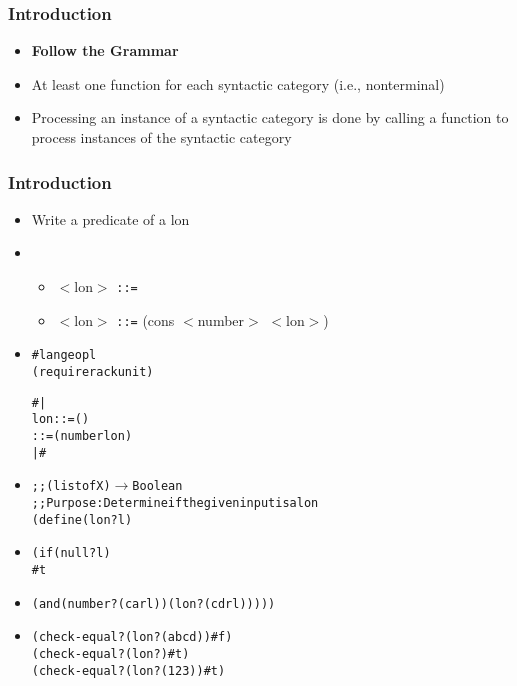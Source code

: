 \documentclass{beamer}
\newcommand{\arrow}{\(\rightarrow\)}
\newcommand{\elist}{\texttt{\textquotesingle{()}}}
\newcommand{\quot}{\texttt{\textquotesingle{}}}
\newcommand{\is}{\texttt{::=}}
\begin{document}
\begin{frame}[fragile]
\frametitle{Introduction}
\begin{scriptsize}
\begin{itemize}
\item<1-> \textbf{Follow the Grammar}

\item<1-> At least one function for each syntactic category (i.e., nonterminal)

\item<1-> Processing an instance of a syntactic category is done by calling a function to process instances of the syntactic category

\end{itemize}
\end{scriptsize}
\end{frame}

\begin{frame}[fragile]
\frametitle{Introduction}
\begin{scriptsize}
\begin{itemize}
\item<1-> Write a predicate of a lon

\item<1->
\begin{itemize}
    \item $<$lon$>$ \is{} \elist{} \newline
    \item $<$lon$>$ \is{} (cons $<$number$>$ $<$lon$>$)
\end{itemize}

\item<2->
\begin{alltt}
#lang eopl
(require rackunit)

#|
lon ::= ()
    ::= (number lon)
|#
\end{alltt}

\item<3->
\begin{alltt}
;; (listof X) \arrow Boolean
;; Purpose: Determine if the given input is a lon
(define (lon? l)
\end{alltt}

\item<5->
\begin{alltt}
  (if (null? l)
      #t
\end{alltt}

\item<6->
\begin{alltt}
      (and (number? (car l)) (lon? (cdr l)))))
\end{alltt}

\item<4->
\begin{alltt}
(check-equal? (lon? \quot{}(a b c d)) #f)
(check-equal? (lon? \elist{}) #t)
(check-equal? (lon? \quot{}(1 2 3)) #t)
\end{alltt}

\end{itemize}
\end{scriptsize}
\end{frame}
\end{document}
